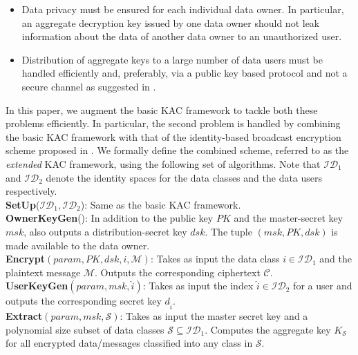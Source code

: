 \begin{itemize}
 \item Data privacy must be ensured for each individual data owner. In particular, an aggregate decryption key issued by one data owner should not leak information about the data of another data owner to an unauthorized user.
 \item Distribution of aggregate keys to a large number of data users must be handled efficiently and, preferably, via a public key based protocol and not a secure channel as suggested in \cite{chu2014key}.
\end{itemize}

\noindent In this paper, we augment the basic KAC framework to tackle both these problems efficiently. In particular, the second problem is handled by combining the basic KAC framework with that of the identity-based broadcast encryption scheme proposed in \cite{boneh2014low}. We formally define the combined scheme, referred to as the \emph{extended} KAC framework, using the following set of algorithms. Note that $\mathcal{ID}_1$ and $\mathcal{ID}_2$ denote the identity spaces for the data classes and the data users respectively.\\

\noindent\textbf{SetUp}($\mathcal{ID}_1,\mathcal{ID}_2$): Same as the basic KAC framework. \\

\noindent\textbf{OwnerKeyGen}(): In addition to the public key $PK$ and the master-secret key $msk$, also outputs a distribution-secret key $dsk$. The tuple $(msk,PK,dsk)$ is made available to the data owner.\\ 

\noindent\textbf{Encrypt}$(param,PK,dsk,i,\mathcal{M})$: Takes as input the data class $i\in\mathcal{ID}_1$ and the plaintext message $\mathcal{M}$. Outputs the corresponding ciphertext $\mathcal{C}$.\\

\noindent\textbf{UserKeyGen}$(param,msk,\hat{i})$: Takes as input the index $\hat{i}\in\mathcal{ID}_2$ for a user and outputs the corresponding secret key $d_{\hat{i}}$.\\ 

\noindent\textbf{Extract}$(param,msk,\mathcal{S})$: Takes as input the master secret key and a polynomial size subset of data classes $\mathcal{S} \subseteq\mathcal{ID}_1$. Computes the aggregate key $K_{\mathcal{S}}$ for all encrypted data/messages classified into any class in $\mathcal{S}$.\\

